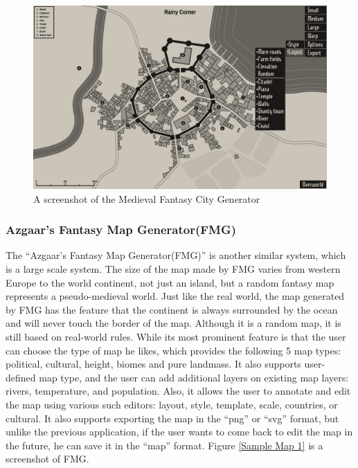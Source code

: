 \begin{figure}[htb]
\centering
\includegraphics[width=\textwidth]{section01/assets/screenshot_MFCG.png}
\caption[A screenshot of the Medieval Fantasy City Generator]{\label{Screenshot MFCG}A screenshot of the Medieval Fantasy City Generator}
\end{figure}

\subsubsection{Azgaar's Fantasy Map Generator(FMG)}
The ``Azgaar's Fantasy Map Generator(FMG)'' is another similar system, which is a large scale system. The size of the map made by FMG varies from western Europe to the world continent, not just an island, but a random fantasy map represents a pseudo-medieval world. Just like the real world, the map generated by FMG has the feature that the continent is always surrounded by the ocean and will never touch the border of the map. Although it is a random map, it is still based on real-world rules. While its most prominent feature is that the user can choose the type of map he likes, which provides the following 5 map types: political, cultural, height, biomes and pure landmass. It also supports user-defined map type, and the user can add additional layers on existing map layers: rivers, temperature, and population. Also, it allows the user to annotate and edit the map using various such editors: layout, style, template, scale, countries, or cultural. It also supports exporting the map in the ``png'' or ``svg'' format, but unlike the previous application, if the user wants to come back to edit the map in the future, he can save it in the ``map'' format. Figure \ref{Sample Map 1} is a screenshot of FMG.

